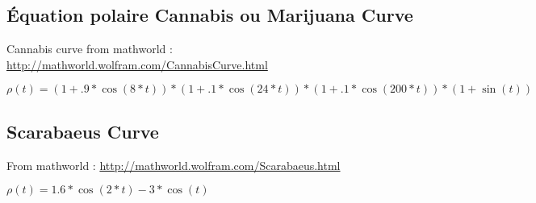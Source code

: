    
   \newpage
\subsection{Équation polaire Cannabis ou Marijuana Curve} 
 Cannabis curve from mathworld : \url{http://mathworld.wolfram.com/CannabisCurve.html}
 
$ \rho(t)=(1+.9*\cos(8*t))*(1+.1*\cos(24*t))*(1+.1*\cos(200*t))*(1+\sin(t)) $
 
\begin{center}
\begin{tkzexample}[vbox]
\end{tkzexample}
\end{center}

 
\newpage
\subsection{Scarabaeus  Curve}
From mathworld : \url{http://mathworld.wolfram.com/Scarabaeus.html}

$\rho(t)=1.6*\cos(2*t)-3*\cos(t) $

\vspace{2cm}
\begin{center}
\begin{tkzexample}[]   
	\end{tkzexample}
\end{center}


\endinput


